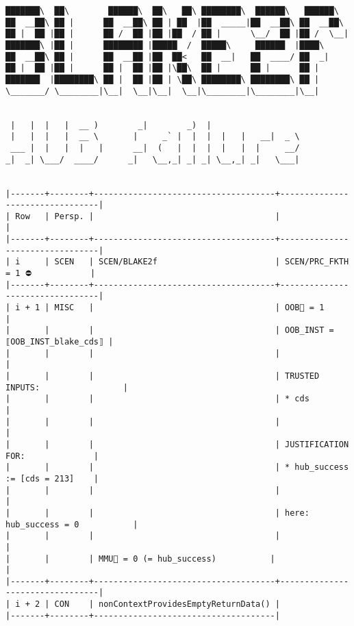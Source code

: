 \documentclass[varwidth=\maxdimen,margin=0.5cm,multi={verbatim}]{standalone}
\begin{document}
\begin{verbatim}
███████\  ██\        ██████\  ██\   ██\ ████████\  ██████\   ██████\
██  __██\ ██ |      ██  __██\ ██ | ██  |██  _____|██  __██\ ██  __██\
██ |  ██ |██ |      ██ /  ██ |██ |██  / ██ |      \__/  ██ |██ /  \__|
███████\ |██ |      ████████ |█████  /  █████\     ██████  |████\
██  __██\ ██ |      ██  __██ |██  ██<   ██  __|   ██  ____/ ██  _|
██ |  ██ |██ |      ██ |  ██ |██ |\██\  ██ |      ██ |      ██ |
███████  |████████\ ██ |  ██ |██ | \██\ ████████\ ████████\ ██ |
\_______/ \________|\__|  \__|\__|  \__|\________|\________|\__|


 |   |  |   |  __ )        _|        _)  |
 |   |  |   |  __ \       |     _` |  |  |  |   |   __|  _ \
 ___ |  |   |  |   |      __|  (   |  |  |  |   |  |     __/
_|  _| \___/  ____/      _|   \__,_| _| _| \__,_| _|   \___|


|-------+--------+-------------------------------------+---------------------------------|
| Row   | Persp. |                                     |                                 |
|-------+--------+-------------------------------------+---------------------------------|
| i     | SCEN   | SCEN/BLAKE2f                        | SCEN/PRC_FKTH = 1 ⛔            |
|-------+--------+-------------------------------------+---------------------------------|
| i + 1 | MISC   |                                     | OOB🏴 = 1                       |
|       |        |                                     | OOB_INST = ⟦OOB_INST_blake_cds⟧ |
|       |        |                                     |                                 |
|       |        |                                     | TRUSTED INPUTS:                 |
|       |        |                                     | * cds                           |
|       |        |                                     |                                 |
|       |        |                                     | JUSTIFICATION FOR:              |
|       |        |                                     | * hub_success := [cds = 213]    |
|       |        |                                     |                                 |
|       |        |                                     | here: hub_success = 0           |
|       |        |                                     |                                 |
|       |        | MMU🏴 = 0 (= hub_success)           |                                 |
|-------+--------+-------------------------------------+---------------------------------|
| i + 2 | CON    | nonContextProvidesEmptyReturnData() |
|-------+--------+-------------------------------------|
\end{verbatim}
\end{document}

